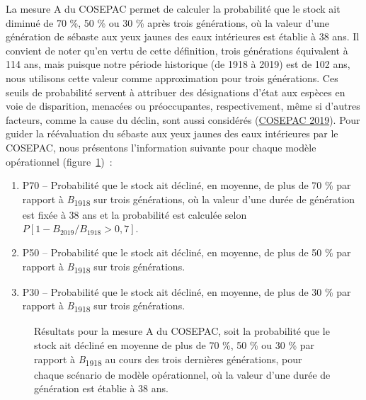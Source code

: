 \documentclass[french,11pt]{book}
\begin{document}
La mesure A du COSEPAC permet de calculer la probabilité que le stock ait diminué de 70 \%, 50 \% ou 30 \% après trois générations, où la valeur d'une génération de sébaste aux yeux jaunes des eaux intérieures est établie à 38 ans. Il convient de noter qu'en vertu de cette définition, trois générations équivalent à 114 ans, mais puisque notre période historique (de 1918 à 2019) est de 102 ans, nous utilisons cette valeur comme approximation pour trois générations. Ces seuils de probabilité servent à attribuer des désignations d'état aux espèces en voie de disparition, menacées ou préoccupantes, respectivement, même si d'autres facteurs, comme la cause du déclin, sont aussi considérés (\protect\hyperlink{ref-cosewic2015}{COSEPAC 2019}). Pour guider la réévaluation du sébaste aux yeux jaunes des eaux intérieures par le COSEPAC, nous présentons l'information suivante pour chaque modèle opérationnel (figure~\ref{fig:cosewic-metrics})~:
\begin{enumerate}
\def\labelenumi{\arabic{enumi}.}

\item
  P70 -- Probabilité que le stock ait décliné, en moyenne, de plus de 70 \% par rapport à \emph{B}\textsubscript{1918} sur trois générations, où la valeur d'une durée de génération est fixée à 38 ans et la probabilité est calculée selon \(P[1 - B_{2019}/B_{1918} > 0,7]\).
\item
  P50 -- Probabilité que le stock ait décliné, en moyenne, de plus de 50 \% par rapport à \emph{B}\textsubscript{1918} sur trois générations.
\item
  P30 -- Probabilité que le stock ait décliné, en moyenne, de plus de 30 \% par rapport à \emph{B}\textsubscript{1918} sur trois générations.
\end{enumerate}

\begin{figure}[htb]

{\centering {} 

}

\caption{Résultats pour la mesure A du COSEPAC, soit la probabilité que le stock ait décliné en moyenne de plus de 70 \%, 50 \% ou 30 \% par rapport à \emph{B}\textsubscript{1918} au cours des trois dernières générations, pour chaque scénario de modèle opérationnel, où la valeur d'une durée de génération est établie à 38 ans.}\label{fig:cosewic-metrics}
\end{figure}
\hypertarget{risque-dextinction-mesure-e-du-cosepac}{%
\label{risque-dextinction-mesure-e-du-cosepac}}
\end{document}
